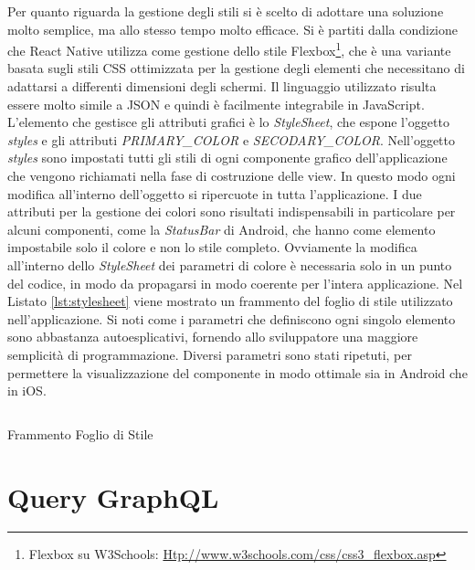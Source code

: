 Per quanto riguarda la gestione degli stili si è scelto di adottare una soluzione molto semplice, ma allo stesso tempo molto efficace. Si è partiti dalla condizione che React Native utilizza come gestione dello stile Flexbox\footnote{Flexbox su W3Schools: \url{Htp://www.w3schools.com/css/css3_flexbox.asp}}, che è una variante basata sugli stili CSS ottimizzata per la gestione degli elementi che necessitano di adattarsi a differenti dimensioni degli schermi. Il linguaggio utilizzato risulta essere molto simile a JSON e quindi è facilmente integrabile in JavaScript. L'elemento che gestisce gli attributi grafici è lo \emph{StyleSheet}, che espone l'oggetto \emph{styles} e gli attributi \emph{PRIMARY\_COLOR} e \emph{SECODARY\_COLOR}.
Nell'oggetto \emph{styles} sono impostati tutti gli stili di ogni componente grafico dell'applicazione che vengono richiamati nella fase di costruzione delle view. In questo modo ogni modifica all'interno dell'oggetto si ripercuote in tutta l'applicazione.
I due attributi per la gestione dei colori sono risultati indispensabili in particolare per alcuni componenti, come la \emph{StatusBar} di Android, che hanno come elemento impostabile solo il colore e non lo stile completo. Ovviamente la modifica all'interno dello \emph{StyleSheet} dei parametri di colore è necessaria solo in un punto del codice, in modo da propagarsi in modo coerente per l'intera applicazione.
Nel Listato \ref{lst:stylesheet} viene mostrato un frammento del foglio di stile utilizzato nell'applicazione. Si noti come i parametri che definiscono ogni singolo elemento sono abbastanza autoesplicativi, fornendo allo sviluppatore una maggiore semplicità di programmazione. Diversi parametri sono stati ripetuti, per permettere la visualizzazione del componente in modo ottimale sia in Android che in iOS.

\begin{listing}[H]
	\inputminted{js}{6-implementazione-app/Codice/stylesheet.js}
	\caption{Frammento Foglio di Stile}
	\label{lst:stylesheet}
\end{listing}

\section{Query GraphQL}\label{sec:utilizzo-dati-app}

